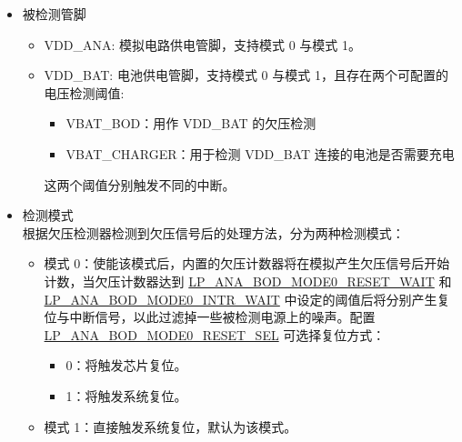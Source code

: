 \documentclass[main\_\_CN.tex]{subfiles}
\begin{document}
\begin{itemize}
    \item 被检测管脚
    \begin{itemize}
        \item VDD\_ANA: 模拟电路供电管脚，支持模式 0 与模式 1。
        \item VDD\_BAT: 电池供电管脚，支持模式 0 与模式 1，且存在两个可配置的电压检测阈值:
        \begin{itemize}
        \item VBAT\_BOD：用作 VDD\_BAT 的欠压检测
        \item VBAT\_CHARGER：用于检测 VDD\_BAT 连接的电池是否需要充电
        \end{itemize}
        这两个阈值分别触发不同的中断。
    \end{itemize}

    \item 检测模式 \\
    根据欠压检测器检测到欠压信号后的处理方法，分为两种检测模式：
    \begin{itemize}
        \item 模式 0：使能该模式后，内置的欠压计数器将在模拟产生欠压信号后开始计数，当欠压计数器达到 \hyperref[fielddesc:LPANABODMODE0RESETWAIT]{LP\_ANA\_BOD\_MODE0\_RESET\_WAIT} 和 \hyperref[fielddesc:LPANABODMODE0INTRWAIT]{LP\_ANA\_BOD\_MODE0\_INTR\_WAIT} 中设定的阈值后将分别产生复位与中断信号，以此过滤掉一些被检测电源上的噪声。配置 \hyperref[fielddesc:LPANABODMODE0RESETSEL]{LP\_ANA\_BOD\_MODE0\_RESET\_SEL} 可选择复位方式：
        \begin{itemize}
            \item 0：将触发芯片复位。
            \item 1：将触发系统复位。
        \end{itemize}
        \item 模式 1：直接触发系统复位，默认为该模式。
    \end{itemize}


\end{itemize}
\end{document}
